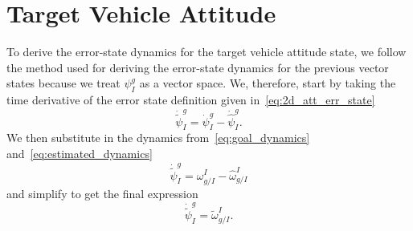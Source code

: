 \section{Target Vehicle Attitude}
To derive the error-state dynamics for the target vehicle attitude state,
we follow the method used for deriving the error-state dynamics for the
previous vector states because we treat $\psi_I^g$ as a vector space. We,
therefore, start by taking the time derivative of the error state definition
given in~\eqref{eq:2d_att_err_state}
\begin{equation}
  \dot{\tilde{\psi}}_I^g = \dot{\psi}_I^g - \dot{\hat{\psi}}_I^g.
\end{equation}
We then substitute in the dynamics from~\eqref{eq:goal_dynamics}
and~\eqref{eq:estimated_dynamics} 
\begin{equation}
  \dot{\tilde{\psi}}_I^g = \omega_{g/I}^I - \hat{\omega}_{g/I}^I
\end{equation}
and simplify to get the final expression
\begin{equation}
  \dot{\tilde{\psi}}_I^g = \tilde{\omega}_{g/I}^I.
\end{equation}

